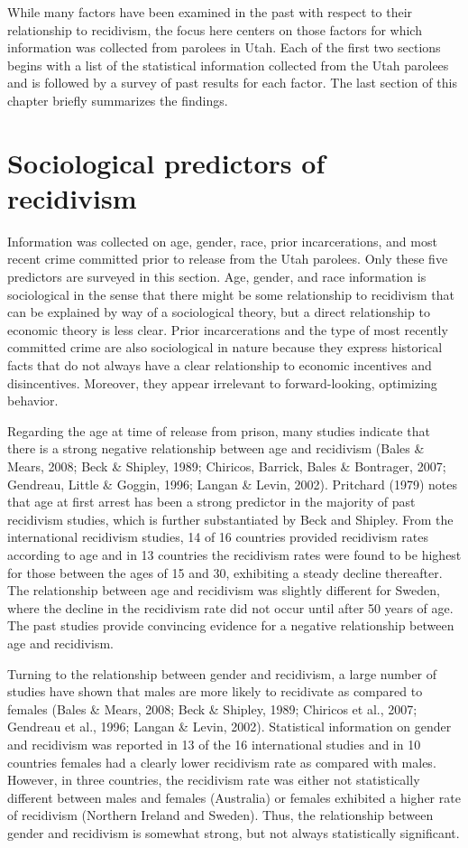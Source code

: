 While many factors have been examined in the past with respect to their relationship to recidivism, the focus here centers on those factors for which information was collected from parolees in Utah.  Each of the first two sections begins with a list of the statistical information collected from the Utah parolees and is followed by a survey of past results for each factor.  The last section of this chapter briefly summarizes the findings.

\section{Sociological predictors of recidivism}

Information was collected on age, gender, race, prior incarcerations, and most recent crime committed prior to release from the Utah parolees.  Only these five predictors are surveyed in this section.  Age, gender, and race information is sociological in the sense that there might be some relationship to recidivism that can be explained by way of a sociological theory, but a direct relationship to economic theory is less clear.  Prior incarcerations and the type of most recently committed crime are also sociological in nature because they express historical facts that do not always have a clear relationship to economic incentives and disincentives.  Moreover, they appear irrelevant to forward-looking, optimizing behavior.

Regarding the age at time of release from prison, many studies indicate that there is a strong negative relationship between age and recidivism (Bales \& Mears, 2008; Beck \& Shipley, 1989; Chiricos, Barrick, Bales \& Bontrager, 2007; Gendreau, Little \& Goggin, 1996; Langan \& Levin, 2002).  Pritchard (1979) notes that age at first arrest has been a strong predictor in the majority of past recidivism studies, which is further substantiated by Beck and Shipley.  From the international recidivism studies, 14 of 16 countries provided recidivism rates according to age and in 13 countries the recidivism rates were found to be highest for those between the ages of 15 and 30, exhibiting a steady decline thereafter.  The relationship between age and recidivism was slightly different for Sweden, where the decline in the recidivism rate did not occur until after 50 years of age.  The past studies provide convincing evidence for a negative relationship between age and recidivism.

Turning to the relationship between gender and recidivism, a large number of studies have shown that males are more likely to recidivate as compared to females (Bales \& Mears, 2008; Beck \& Shipley, 1989; Chiricos et al., 2007; Gendreau et al., 1996; Langan \& Levin, 2002).  Statistical information on gender and recidivism was reported in 13 of the 16 international studies and in 10 countries females had a clearly lower recidivism rate as compared with males.  However, in three countries, the recidivism rate was either not statistically different between males and females (Australia) or females exhibited a higher rate of recidivism (Northern Ireland and Sweden).  Thus, the relationship between gender and recidivism is somewhat strong, but not always statistically significant.

